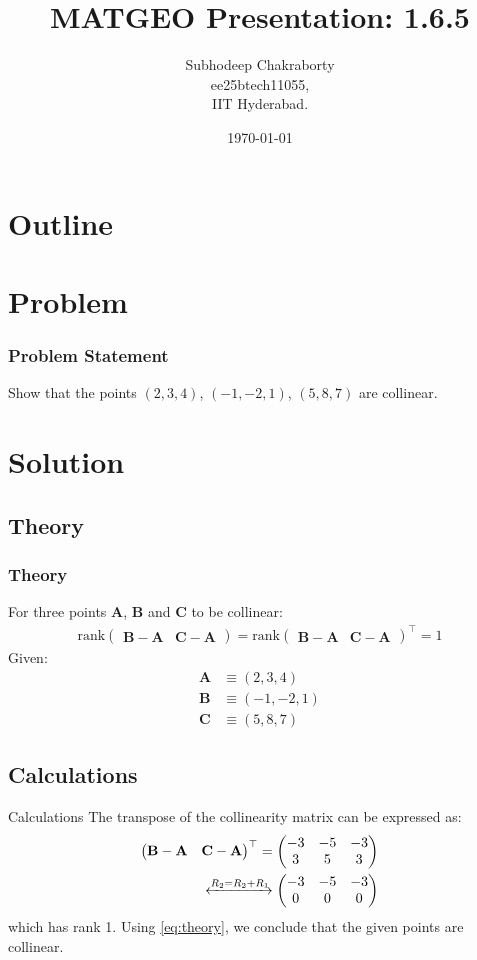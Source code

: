 \documentclass{beamer}
\title{MATGEO Presentation: 1.6.5}
\author{Subhodeep Chakraborty \\ ee25btech11055,\\IIT Hyderabad.}
\date{\today}
\providecommand{\brak}[1]{\ensuremath{\left(#1\right)}}
\theoremstyle{remark}
\newcommand{\myvec}[1]{\ensuremath{\begin{pmatrix}#1\end{pmatrix}}}
\let\vec\mathbf
\numberwithin{equation}{section}
\begin{document}
\begin{frame}
\titlepage
\end{frame}

\section*{Outline}
\begin{frame}
\tableofcontents
\end{frame}

\section{Problem}
\begin{frame}
\frametitle{Problem Statement}

 Show that the points \brak{2, 3, 4}, \brak{-1, -2, 1}, \brak{5, 8, 7} are collinear.

\end{frame}

\section{Solution}
\subsection{Theory}
\begin{frame}
 \frametitle{Theory}
 For three points $\vec{A}$, $\vec{B}$ and $\vec{C}$ to be collinear:
\begin{align}
    \label{eq:theory}
    \text{rank}\myvec{\vec{B-A} & \vec{C-A}} = \text{rank}\myvec{\vec{B-A} & \vec{C-A}}^\top = 1
\end{align}
Given:
\begin{align}
 \vec{A} &\equiv \brak{2, 3, 4} \\
 \vec{B} &\equiv \brak{-1, -2, 1} \\
 \vec{C} &\equiv \brak{5, 8, 7}
\end{align}
\end{frame}

\subsection{Calculations}
\begin{frame}{Calculations}
The transpose of the collinearity matrix can be expressed as:
\begin{align*}
 \myvec{\vec{B-A} & \vec{C-A}}^\top = \myvec{-3 & -5 & -3 \\ 3 & 5 & 3} \\
 \xleftrightarrow[]{R_2 = R_2 + R_1}
 \myvec{-3 & -5 & -3 \\ 0 & 0 & 0}
\end{align*}
which has rank 1. Using \ref{eq:theory}, we conclude that the given points are collinear.
\end{frame}
\end{document}
